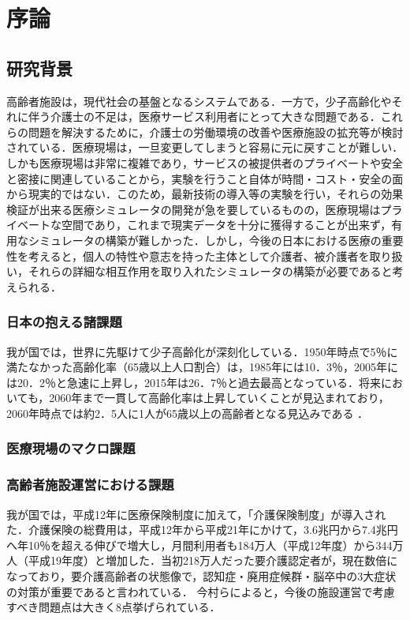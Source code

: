 \chapter{序論}

\section{研究背景}

高齢者施設は，現代社会の基盤となるシステムである．一方で，少子高齢化やそれに伴う介護士の不足は，医療サービス利用者にとって大きな問題である．これらの問題を解決するために，介護士の労働環境の改善や医療施設の拡充等が検討されている．医療現場は，一旦変更してしまうと容易に元に戻すことが難しい．しかも医療現場は非常に複雑であり，サービスの被提供者のプライベートや安全と密接に関連していることから，実験を行うこと自体が時間・コスト・安全の面から現実的ではない．このため，最新技術の導入等の実験を行い，それらの効果検証が出来る医療シミュレータの開発が急を要しているものの，医療現場はプライベートな空間であり，これまで現実データを十分に獲得することが出来ず，有用なシミュレータの構築が難しかった．しかし，今後の日本における医療の重要性を考えると，個人の特性や意志を持った主体として介護者、被介護者を取り扱い，それらの詳細な相互作用を取り入れたシミュレータの構築が必要であると考えられる．

\subsection{日本の抱える諸課題}

我が国では，世界に先駆けて少子高齢化が深刻化している．1950年時点で5％に満たなかった高齢化率（65歳以上人口割合）は，1985年には10．3％，2005年には20．2％と急速に上昇し，2015年は26．7％と過去最高となっている．将来においても，2060年まで一貫して高齢化率は上昇していくことが見込まれており，2060年時点では約2．5人に1人が65歳以上の高齢者となる見込みである \cite{ex_kousei_v1}．

\subsection{医療現場のマクロ課題}


\subsection{高齢者施設運営における課題}
我が国では，平成12年に医療保険制度に加えて，「介護保険制度」が導入された．介護保険の総費用は，平成12年から平成21年にかけて，3.6兆円から7.4兆円へ年10％を超える伸びで増大し，月間利用者も184万人（平成12年度）から344万人（平成19年度）と増加した．当初218万人だった要介護認定者が，現在数倍になっており，要介護高齢者の状態像で，認知症・廃用症候群・脳卒中の3大症状の対策が重要であると言われている．
今村ら\cite{nursing_management}によると，今後の施設運営で考慮すべき問題点は大きく8点挙げられている．


